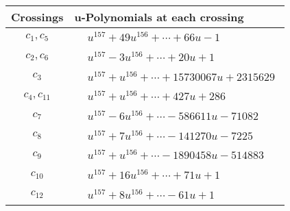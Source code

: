 \documentclass[1p]{elsarticle_modified}
\theoremstyle{definition}
\begin{document}
\begin{tabular}{m{50pt}|m{274pt}}
Crossings & \hspace{64pt}u-Polynomials at each crossing \\
\hline $$\begin{aligned}c_{1},c_{5}\end{aligned}$$&$\begin{aligned}
&u^{157}+49 u^{156}+\cdots+66 u-1
\end{aligned}$\\
\hline $$\begin{aligned}c_{2},c_{6}\end{aligned}$$&$\begin{aligned}
&u^{157}-3 u^{156}+\cdots+20 u+1
\end{aligned}$\\
\hline $$\begin{aligned}c_{3}\end{aligned}$$&$\begin{aligned}
&u^{157}+u^{156}+\cdots+15730067 u+2315629
\end{aligned}$\\
\hline $$\begin{aligned}c_{4},c_{11}\end{aligned}$$&$\begin{aligned}
&u^{157}+u^{156}+\cdots+427 u+286
\end{aligned}$\\
\hline $$\begin{aligned}c_{7}\end{aligned}$$&$\begin{aligned}
&u^{157}-6 u^{156}+\cdots-586611 u-71082
\end{aligned}$\\
\hline $$\begin{aligned}c_{8}\end{aligned}$$&$\begin{aligned}
&u^{157}+7 u^{156}+\cdots-141270 u-7225
\end{aligned}$\\
\hline $$\begin{aligned}c_{9}\end{aligned}$$&$\begin{aligned}
&u^{157}+u^{156}+\cdots-1890458 u-514883
\end{aligned}$\\
\hline $$\begin{aligned}c_{10}\end{aligned}$$&$\begin{aligned}
&u^{157}+16 u^{156}+\cdots+71 u+1
\end{aligned}$\\
\hline $$\begin{aligned}c_{12}\end{aligned}$$&$\begin{aligned}
&u^{157}+8 u^{156}+\cdots-61 u+1
\end{aligned}$\\
\hline
\end{tabular}\\~\\
\end{document}
